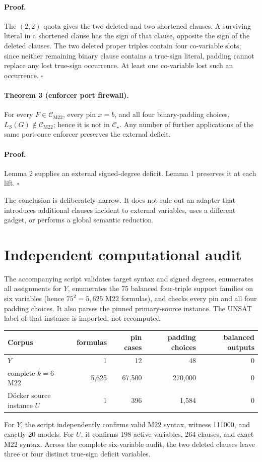 \documentclass[11pt]{article}
\newcommand{\CM}{\mathcal C_{\mathrm{M22}}}
\newcommand{\CS}{\mathcal C_\star}
\begin{document}
\paragraph{Proof.}
The $(2,2)$ quota gives the two deleted and two shortened clauses.  A surviving
literal in a shortened clause has the sign of that clause, opposite the sign
of the deleted clauses.  The two deleted proper triples contain four
co-variable slots; since neither remaining binary clause contains a
true-sign literal, padding cannot replace any lost true-sign occurrence.
At least one co-variable lost such an occurrence. \(\square\)

\paragraph{Theorem 3 (enforcer port firewall).}
For every $F\in\CM$, every pin $x=b$, and all four binary-padding choices,
$L_S(G)\notin\CM$; hence it is not in $\CS$.  Any number of further applications
of the same port-once enforcer preserves the external deficit.

\paragraph{Proof.}
Lemma 2 supplies an external signed-degree deficit.  Lemma 1 preserves it at
each lift. \(\square\)

The conclusion is deliberately narrow.  It does not rule out an adapter that
introduces additional clauses incident to external variables, uses a different
gadget, or performs a global semantic reduction.

\section{Independent computational audit}
The accompanying script validates target syntax and signed degrees, enumerates
all assignments for $Y$, enumerates the 75 balanced four-triple support
families on six variables (hence $75^2=5{,}625$ M22 formulas), and checks every
pin and all four padding choices.  It also parses the pinned primary-source
instance.  The UNSAT label of that instance is imported, not recomputed.
\begin{center}
\begin{tabular}{lrrrr}
\toprule
Corpus & formulas & pin cases & padding choices & balanced outputs\\
\midrule
$Y$ & 1 & 12 & 48 & 0\\
complete $k=6$ M22 & 5,625 & 67,500 & 270,000 & 0\\
D\"ocker source instance $U$ & 1 & 396 & 1,584 & 0\\
\bottomrule
\end{tabular}
\end{center}
For $Y$, the script independently confirms valid M22 syntax, witness 111000,
and exactly 20 models.  For $U$, it confirms 198 active variables, 264 clauses,
and exact M22 syntax.  Across the complete six-variable audit, the two deleted
clauses leave three or four distinct true-sign deficit variables.
\end{document}

